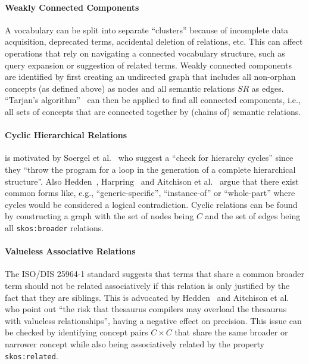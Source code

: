 {\paragraph{Weakly Connected Components}

A vocabulary can be split into separate ``clusters'' because of incomplete data acquisition, deprecated terms, accidental deletion of relations, etc. This can affect operations that rely on navigating a connected vocabulary structure, such as query expansion or suggestion of related terms.
Weakly connected components are identified by first creating an undirected graph that includes all non-orphan concepts (as defined above) as nodes and all semantic relations $SR$ as edges. ``Tarjan's algorithm''~\cite{Hopcroft1973} can then be applied to find all connected components, i.e., all sets of concepts that are connected together by (chains of) semantic relations.

\paragraph{Cyclic Hierarchical Relations}

is motivated by Soergel et al.~\cite{Soergel2002} who suggest a ``check for hierarchy cycles'' since they ``throw the program for a loop in the generation of a complete hierarchical structure''. Also Hedden~\cite{Hedden2010}, Harpring~\cite{Harpring2010} and Aitchison et al.~\cite{Aitchison2000} argue that there exist common forms like, e.g., ``generic-specific'', ``instance-of'' or ``whole-part'' where cycles would be considered a logical contradiction.
Cyclic relations can be found by constructing a graph with the set of nodes being $C$ and the set of edges being all \texttt{skos:broader} relations.

\paragraph{Valueless Associative Relations}

The ISO/DIS 25964-1 standard \cite{ISO25964-1:2011} suggests that terms that share a common broader term should not be related associatively if this relation is only justified by the fact that they are siblings. This is advocated by Hedden~\cite{Hedden2010} and Aitchison et al.~\cite{Aitchison2000} who point out ``the risk that thesaurus compilers may overload the thesaurus with valueless relationships'', having a negative effect on precision.
This issue can be checked by identifying concept pairs $C \times C$ that share the same broader or narrower concept while also being associatively related by the property \texttt{skos:related}.

}
